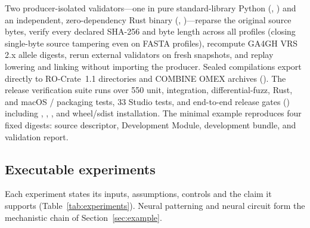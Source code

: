\documentclass[10.5pt,a4paper]{article}
\begin{document}
Two producer-isolated validators—one in pure standard-library Python (, ) and an independent, zero-dependency Rust binary (, )—reparse the original source bytes, verify every declared  SHA-256 and byte length across all profiles (closing single-byte source tampering even on FASTA profiles), recompute GA4GH VRS 2.x allele digests, rerun external validators on fresh snapshots, and replay lowering and linking without importing the producer. Sealed compilations export directly to RO-Crate~1.1 directories and COMBINE OMEX archives (). The release verification suite runs over 550 unit, integration, differential-fuzz, Rust, and macOS / packaging tests, 33 Studio tests, and end-to-end release gates () including , , , and wheel/sdist installation. The minimal example reproduces four fixed digests: source descriptor, Development Module, development bundle, and validation report.

\subsection{Executable experiments}\label{sec:experiments}

Each experiment states its inputs, assumptions, controls and the claim it supports (Table~\ref{tab:experiments}). Neural patterning and neural circuit form the mechanistic chain of Section~\ref{sec:example}.
\end{document}

